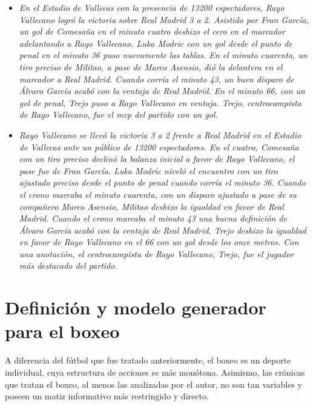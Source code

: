 \begin{itemize}
    \item \textit{En el Estadio de Vallecas con la presencia de 13200 espectadores, Rayo Vallecano logró la victoria sobre Real Madrid 3 a 2.
    Asistido por Fran García, un gol de Comesaña en el minuto cuatro deshizo el cero en el marcador adelantando a Rayo Vallecano. Luka Modric con un gol desde el punto de penal en el minuto 36 puso nuevamente las tablas. En el minuto cuarenta, un tiro preciso de Militao, a pase de Marco Asensio, dió la delantera en el marcador a Real Madrid. Cuando corría el minuto 43, un buen disparo de Álvaro García acabó con la ventaja de Real Madrid. En el minuto 66, con un gol de penal, Trejo puso a Rayo Vallecano en ventaja.
    Trejo, centrocampista de Rayo Vallecano, fue el mvp del partido con un gol.}
    \item \textit{Rayo Vallecano se llevó la victoria 3 a 2 frente a Real Madrid en el Estadio de Vallecas ante un público de 13200 espectadores.
    En el cuatro, Comesaña con un tiro preciso declinó la balanza inicial a favor de Rayo Vallecano, el pase fue de Fran García. Luka Modric niveló el encuentro con un tiro ajustado preciso desde el punto de penal cuando corría el minuto 36. Cuando el crono marcaba el minuto cuarenta, con un disparo ajustado a pase de su compañero Marco Asensio, Militao deshizo la igualdad en favor de Real Madrid. Cuando el crono marcaba el minuto 43 una buena definición de Álvaro García acabó con la ventaja de Real Madrid. Trejo deshizo la igualdad en favor de Rayo Vallecano en el 66 con un gol desde los once metros.
    Con una anotación, el centrocampista de Rayo Vallecano, Trejo, fue el jugador más destacado del partido.}
\end{itemize}


\section{Definición y modelo generador para el boxeo}

    A diferencia del fútbol que fue tratado anteriormente, el boxeo es un deporte individual, cuya estructura de acciones es más monótona. Asimismo, 
las crónicas que tratan el boxeo, al menos las analizadas por el autor, no son tan variables y poseen un matiz informativo más restringido y directo. 

